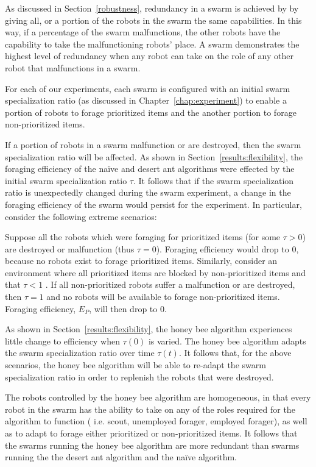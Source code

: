 As discussed in Section~\ref{robustness}, redundancy in a swarm is achieved by by giving all, or a portion of the robots in the swarm the same capabilities. In this way, if a percentage of the swarm malfunctions, the other robots have the capability to take the malfunctioning robots' place. A swarm demonstrates the highest level of redundancy when any robot can take on the role of any other robot that malfunctions in a swarm. 

For each of our experiments, each swarm is configured with an initial swarm specialization ratio (as discussed in Chapter~\ref{chap:experiment}) to enable a portion of robots to forage prioritized items and the another portion to forage non-prioritized items. 

If a portion of robots in a swarm malfunction or are destroyed, then the swarm specialization ratio will be affected. As shown in Section~\ref{results:flexibility}, the foraging efficiency of the na\"ive and desert ant algorithms were effected by the initial swarm specialization ratio $\tau$. It follows that if the swarm specialization ratio is unexpectedly changed during the swarm experiment, a change in the foraging efficiency of the swarm would persist for the experiment. In particular, consider the following extreme scenarios: 

Suppose all the robots which were foraging for prioritized items (for some $\tau > 0$) are destroyed or malfunction (thus $\tau=0$). Foraging efficiency would drop to 0, because no robots exist to forage prioritized items. Similarly, consider an environment where all prioritized items are blocked by non-prioritized items and that $\tau < 1$ . If all non-prioritized robots suffer a malfunction or are destroyed, then $\tau=1$ and no robots will be available to forage non-prioritized items. Foraging efficiency, $E_P$, will then drop to 0. 

As shown in Section~\ref{results:flexibility}, the honey bee algorithm experiences little change to efficiency when $\tau(0)$ is varied. The honey bee algorithm adapts the swarm specialization ratio  over time $\tau(t)$. It follows that, for the above scenarios, the honey bee algorithm will be able to re-adapt the swarm specialization ratio in order to replenish the robots that were destroyed. 

The robots controlled by the honey bee algorithm are homogeneous, in that every robot in the swarm has the ability to take on any of the roles required for the algorithm to function ( i.e. scout, unemployed forager, employed forager), as well as to adapt to forage either prioritized or non-prioritized items. It follows that the swarms running the honey bee algorithm are more redundant than swarms running the the desert ant algorithm and the na\"ive algorithm.

